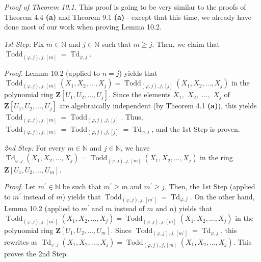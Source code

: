 \documentclass[numbers=enddot,12pt,final,onecolumn,notitlepage]{scrartcl}%
\begin{document}
\textit{Proof of Theorem 10.1.} This proof is going to be very similar to the
proofs of Theorem 4.4 \textbf{(a)} and Theorem 9.1 \textbf{(a)} - except that
this time, we already have done most of our work when proving Lemma 10.2.

\textit{1st Step:} Fix $m\in\mathbb{N}$ and $j\in\mathbb{N}$ such that $m\geq
j$. Then, we claim that $\operatorname*{Todd}\nolimits_{\left(  \varphi
,j\right)  ,j,\left[  m\right]  }=\operatorname*{Td}\nolimits_{\varphi,j}$.

\textit{Proof.} Lemma 10.2 (applied to $n=j$) yields that
$\operatorname*{Todd}\nolimits_{\left(  \varphi,j\right)  ,j,\left[  m\right]
}\left(  X_{1},X_{2},...,X_{j}\right)  =\operatorname*{Todd}\nolimits_{\left(
\varphi,j\right)  ,j,\left[  j\right]  }\left(  X_{1},X_{2},...,X_{j}\right)
$ in the polynomial ring $\mathbf{Z}\left[  U_{1},U_{2},...,U_{j}\right]  $.
Since the elements $X_{1},$ $X_{2},$ $...,$ $X_{j}$ of $\mathbf{Z}\left[
U_{1},U_{2},...,U_{j}\right]  $ are algebraically independent (by Theorem 4.1
\textbf{(a)}), this yields $\operatorname*{Todd}\nolimits_{\left(
\varphi,j\right)  ,j,\left[  m\right]  }=\operatorname*{Todd}%
\nolimits_{\left(  \varphi,j\right)  ,j,\left[  j\right]  }$. Thus,
$\operatorname*{Todd}\nolimits_{\left(  \varphi,j\right)  ,j,\left[  m\right]
}=\operatorname*{Todd}\nolimits_{\left(  \varphi,j\right)  ,j,\left[
j\right]  }=\operatorname*{Td}\nolimits_{\varphi,j}$, and the 1st Step is proven.

\textit{2nd Step:} For every $m\in\mathbb{N}$ and $j\in\mathbb{N}$, we have
$\operatorname*{Td}\nolimits_{\varphi,j}\left(  X_{1},X_{2},...,X_{j}\right)
=\operatorname*{Todd}\nolimits_{\left(  \varphi,j\right)  ,j,\left[  m\right]
}\left(  X_{1},X_{2},...,X_{j}\right)  $ in the ring $\mathbf{Z}\left[
U_{1},U_{2},...,U_{m}\right]  $.

\textit{Proof.} Let $m^{\prime}\in\mathbb{N}$ be such that $m^{\prime}\geq m$
and $m^{\prime}\geq j$. Then, the 1st Step (applied to $m^{\prime}$ instead of
$m$) yields that $\operatorname*{Todd}\nolimits_{\left(  \varphi,j\right)
,j,\left[  m^{\prime}\right]  }=\operatorname*{Td}\nolimits_{\varphi,j}$. On
the other hand, Lemma 10.2 (applied to $m^{\prime}$ and $m$ instead of $m$ and
$n$) yields that $\operatorname*{Todd}\nolimits_{\left(  \varphi,j\right)
,j,\left[  m^{\prime}\right]  }\left(  X_{1},X_{2},...,X_{j}\right)
=\operatorname*{Todd}\nolimits_{\left(  \varphi,j\right)  ,j,\left[  m\right]
}\left(  X_{1},X_{2},...,X_{j}\right)  $ in the polynomial ring $\mathbf{Z}%
\left[  U_{1},U_{2},...,U_{m}\right]  $. Since $\operatorname*{Todd}%
\nolimits_{\left(  \varphi,j\right)  ,j,\left[  m^{\prime}\right]
}=\operatorname*{Td}\nolimits_{\varphi,j}$, this rewrites as
$\operatorname*{Td}\nolimits_{\varphi,j}\left(  X_{1},X_{2},...,X_{j}\right)
=\operatorname*{Todd}\nolimits_{\left(  \varphi,j\right)  ,j,\left[  m\right]
}\left(  X_{1},X_{2},...,X_{j}\right)  $. This proves the 2nd Step.
\end{document}
